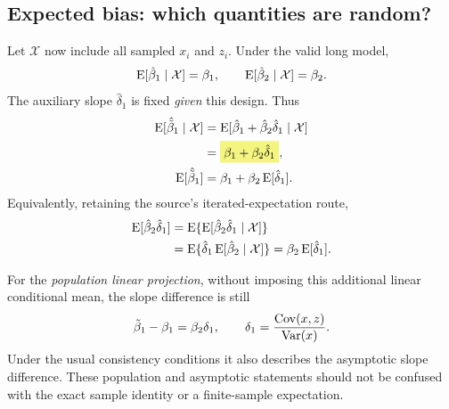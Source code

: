 \subsection{Expected bias: which quantities are random?}
\label{sec:ovb-expectation}
Let $\mathcal X$ now include all sampled $x_i$ and $z_i$. Under the valid long model,
\[\operatorname{E}[\hat\beta_1\mid\mathcal X]=\beta_1,
\qquad\operatorname{E}[\hat\beta_2\mid\mathcal X]=\beta_2.
\]
The auxiliary slope $\hat\delta_1$ is fixed \emph{given} this design. Thus
\begin{align}
\E[\hat{\tilde\beta}_1\mid\mathcal X]
&=\E[\hat\beta_1+\hat\beta_2\hat\delta_1\mid\mathcal X]\notag\\
&=\hm{\beta_1+\beta_2\hat\delta_1},\label{eq:ovb-conditional}\\
\E[\hat{\tilde\beta}_1]
&=\beta_1+\beta_2\E[\hat\delta_1].\label{eq:ovb-unconditional}
\end{align}
Equivalently, retaining the source's iterated-expectation route,
\begin{align*}
\operatorname{E}[\hat\beta_2\hat\delta_1]
&=\operatorname{E}\{\operatorname{E}[\hat\beta_2\hat\delta_1\mid\mathcal X]\}\\
&=\operatorname{E}\{\hat\delta_1\operatorname{E}[\hat\beta_2\mid\mathcal X]\}
=\beta_2\operatorname{E}[\hat\delta_1].
\end{align*}

For the \emph{population linear projection}, without imposing this additional linear conditional mean, the slope difference is still
\[\tilde\beta_1-\beta_1=\beta_2\delta_1,
\qquad\delta_1=\frac{\operatorname{Cov}(x,z)}{\operatorname{Var}(x)}.
\]
Under the usual consistency conditions it also describes the asymptotic slope difference. These population and asymptotic statements should not be confused with the exact sample identity or a finite-sample expectation.

